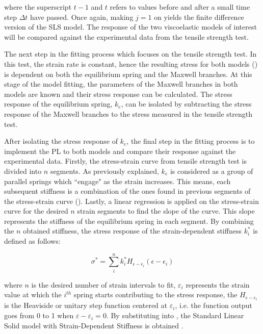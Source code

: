 \noindent where the superscript $t-1$ and $t$ refers to values before and after a small time step $\Delta t$ have passed. Once again, making $j=1$ on  yields the finite difference version of the SLS model. The response of the two viscoelastic models of interest will be compared against the experimental data from the tensile strength test.

The next step in the fitting process which focuses on the tensile strength test. In this test, the strain rate is constant, hence the resulting stress for both models () is dependent on both the equilibrium spring and the Maxwell branches. At this stage of the model fitting, the parameters of the Maxwell branches in both models are known and their stress response can be calculated. The stress response of the equilibrium spring, $k_e$, can be isolated by subtracting the stress response of the Maxwell branches to the stress measured in the tensile strength test. 

After isolating the stress response of $k_e$, the final step in the fitting process is to implement the PL to both models and compare their response against the experimental data. Firstly, the stress-strain curve from tensile strength test is divided into $n$ segments. As previously explained, $k_e$ is considered as a group of parallel springs which ``engage" as the strain increases. This means, each subsequent stiffness is a combination of the ones found in previous segments of the stress-strain curve ().  Lastly, a linear regression is applied on the stress-strain curve for the desired $n$ strain segments to find the slope of the curve. This slope represents the stiffness of the equilibrium spring in each segment. By combining the $n$ obtained stiffness, the stress response of the strain-dependent stiffness $k_i^*$ is defined as follows:

\begin{equation}
\label{eq5}
\sigma^* = \sum_i^n k_i^* H_{\epsilon - \epsilon_i}(\epsilon - \epsilon_i)
\end{equation}

\noindent where $n$ is the desired number of strain intervals to fit, $\varepsilon_i$ represents the strain value at which the $i^{th}$ spring starts contributing to the stress response, the $H_{\epsilon - \epsilon_i}$ is the Heaviside or unitary step function centered at $\varepsilon_i$, i.e. the function output goes from 0 to 1 when $\varepsilon - \varepsilon_i = 0$. By substituting  into , the Standard Linear Solid model with Strain-Dependent Stiffness is obtained \cite{austin2015control}.

